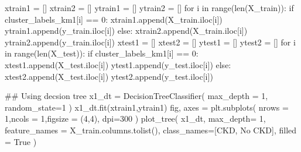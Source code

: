 \documentclass[
  11pt,
  letterpaper,
  DIV=11,
  numbers=noendperiod]{scrartcl}
\newenvironment{Shaded}{\begin{snugshade}}{\end{snugshade}}
\newcommand{\BuiltInTok}[1]{\textcolor[rgb]{0.00,0.23,0.31}{#1}}
\newcommand{\CommentTok}[1]{\textcolor[rgb]{0.37,0.37,0.37}{#1}}
\newcommand{\ControlFlowTok}[1]{\textcolor[rgb]{0.00,0.23,0.31}{#1}}
\newcommand{\DecValTok}[1]{\textcolor[rgb]{0.68,0.00,0.00}{#1}}
\newcommand{\KeywordTok}[1]{\textcolor[rgb]{0.00,0.23,0.31}{#1}}
\newcommand{\NormalTok}[1]{\textcolor[rgb]{0.00,0.23,0.31}{#1}}
\newcommand{\OperatorTok}[1]{\textcolor[rgb]{0.37,0.37,0.37}{#1}}
\newcommand{\StringTok}[1]{\textcolor[rgb]{0.13,0.47,0.30}{#1}}
\newcommand{\VariableTok}[1]{\textcolor[rgb]{0.07,0.07,0.07}{#1}}
\begin{document}
\begin{Shaded}
\begin{Highlighting}[]
\NormalTok{xtrain1 }\OperatorTok{=}\NormalTok{ []}
\NormalTok{xtrain2 }\OperatorTok{=}\NormalTok{ []}
\NormalTok{ytrain1 }\OperatorTok{=}\NormalTok{ []}
\NormalTok{ytrain2 }\OperatorTok{=}\NormalTok{ []}
\ControlFlowTok{for}\NormalTok{ i }\KeywordTok{in} \BuiltInTok{range}\NormalTok{(}\BuiltInTok{len}\NormalTok{(X\_train)):}
    \ControlFlowTok{if}\NormalTok{ cluster\_labels\_km1[i] }\OperatorTok{==} \DecValTok{0}\NormalTok{:}
\NormalTok{        xtrain1.append(X\_train.iloc[i])}
\NormalTok{        ytrain1.append(y\_train.iloc[i])}
    \ControlFlowTok{else}\NormalTok{:}
\NormalTok{        xtrain2.append(X\_train.iloc[i])}
\NormalTok{        ytrain2.append(y\_train.iloc[i])}
\NormalTok{xtest1 }\OperatorTok{=}\NormalTok{ []}
\NormalTok{xtest2 }\OperatorTok{=}\NormalTok{ []}
\NormalTok{ytest1 }\OperatorTok{=}\NormalTok{ []}
\NormalTok{ytest2 }\OperatorTok{=}\NormalTok{ []}
\ControlFlowTok{for}\NormalTok{ i }\KeywordTok{in} \BuiltInTok{range}\NormalTok{(}\BuiltInTok{len}\NormalTok{(X\_test)):}
    \ControlFlowTok{if}\NormalTok{ cluster\_labels\_km1[i] }\OperatorTok{==} \DecValTok{0}\NormalTok{:}
\NormalTok{        xtest1.append(X\_test.iloc[i])}
\NormalTok{        ytest1.append(y\_test.iloc[i])}
    \ControlFlowTok{else}\NormalTok{:}
\NormalTok{        xtest2.append(X\_test.iloc[i])}
\NormalTok{        ytest2.append(y\_test.iloc[i])}
\end{Highlighting}
\end{Shaded}

\begin{Shaded}
\begin{Highlighting}[]
\CommentTok{\#\# Using decsion tree}
\NormalTok{x1\_dt }\OperatorTok{=}\NormalTok{ DecisionTreeClassifier(}
\NormalTok{    max\_depth }\OperatorTok{=} \DecValTok{1}\NormalTok{,}
\NormalTok{    random\_state}\OperatorTok{=}\DecValTok{1}
\NormalTok{) }
\NormalTok{x1\_dt.fit(xtrain1,ytrain1)}
\NormalTok{fig, axes }\OperatorTok{=}\NormalTok{ plt.subplots(}
\NormalTok{    nrows }\OperatorTok{=} \DecValTok{1}\NormalTok{,ncols }\OperatorTok{=} \DecValTok{1}\NormalTok{,figsize }\OperatorTok{=}\NormalTok{ (}\DecValTok{4}\NormalTok{,}\DecValTok{4}\NormalTok{), dpi}\OperatorTok{=}\DecValTok{300}
\NormalTok{    )}
\NormalTok{plot\_tree(}
\NormalTok{    x1\_dt, }
\NormalTok{    max\_depth}\OperatorTok{=} \DecValTok{1}\NormalTok{, }
\NormalTok{    feature\_names }\OperatorTok{=}\NormalTok{ X\_train.columns.tolist(), }
\NormalTok{    class\_names}\OperatorTok{=}\NormalTok{[}\StringTok{\textquotesingle{}CKD\textquotesingle{}}\NormalTok{, }\StringTok{\textquotesingle{}No CKD\textquotesingle{}}\NormalTok{], }
\NormalTok{    filled }\OperatorTok{=} \VariableTok{True}
\NormalTok{    )}
\end{Highlighting}
\end{Shaded}
\end{document}
